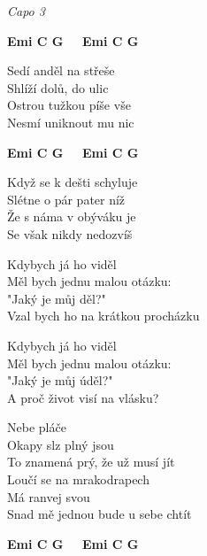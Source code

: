
\re{}
\textit{Capo 3}

\re{}
{\footnotesize\textbf{Emi C G \ \ Emi C G}}

\ve{}
Sedí anděl na střeše\\
Shlíží dolů, do ulic\\
Ostrou tužkou píše vše\\
Nesmí uniknout mu nic

\re{}
{\footnotesize\textbf{Emi C G \ \ Emi C G}}

\ve{}
Když se k dešti schyluje\\
Slétne o pár pater níž\\
Že s náma v obýváku je\\
Se však nikdy nedozvíš

\cho{}
Kdybych já ho viděl\\
Měl bych jednu malou otázku:\\
"Jaký je můj děl?"\\
Vzal bych ho na krátkou procházku

Kdybych já ho viděl\\
Měl bych jednu malou otázku:\\
"Jaký je můj úděl?"\\
A proč život visí na vlásku?

\ve{}
Nebe pláče\\
Okapy slz plný jsou\\
To znamená prý, že už musí jít\\
Loučí se na mrakodrapech\\
Má ranvej svou\\
Snad mě jednou bude u sebe chtít

\re{}
{\footnotesize\textbf{Emi C G \ \ Emi C G}}

\cho{}


\esong